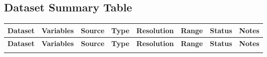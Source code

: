 \documentclass[12pt,a4paper]{report}
\begin{document}
\begin{spacing}{1.5}
\section{Dataset Summary Table}

\begin{spacing}{1.0}
\small
\begin{longtable}{|p{2.0cm}|p{2.2cm}|p{1.5cm}|p{1.0cm}|p{1.5cm}|p{1.0cm}|p{1.0cm}|p{2.5cm}|}
\hline
\textbf{Dataset} & \textbf{Variables} & \textbf{Source} & \textbf{Type} & \textbf{Resolution} & \textbf{Range} & \textbf{Status} & \textbf{Notes} \\ \hline
\endfirsthead

\hline
\textbf{Dataset} & \textbf{Variables} & \textbf{Source} & \textbf{Type} & \textbf{Resolution} & \textbf{Range} & \textbf{Status} & \textbf{Notes} \\ \hline
\endhead

\hline
\endfoot

\hline
\endlastfoot


\end{longtable}
\end{spacing}
\end{spacing}
\end{document}
